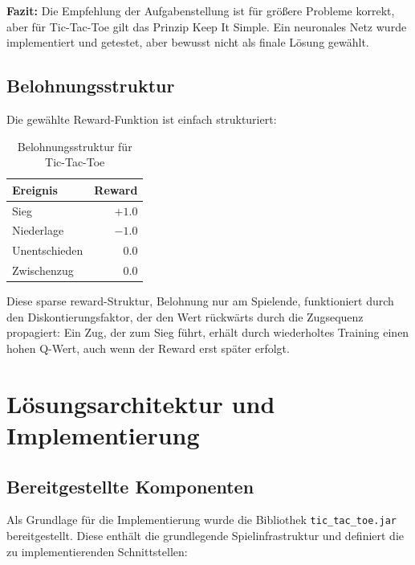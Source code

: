 \textbf{Fazit:} Die Empfehlung der Aufgabenstellung ist für größere Probleme korrekt, aber für Tic-Tac-Toe gilt das Prinzip \glqq Keep It Simple\grqq{}. Ein neuronales Netz wurde implementiert und getestet, aber bewusst nicht als finale Lösung gewählt.

\subsection{Belohnungsstruktur}

Die gewählte Reward-Funktion ist einfach strukturiert:

\begin{table}[H]
\centering
\begin{tabular}{l|r}
\textbf{Ereignis} & \textbf{Reward} \\
\hline
Sieg & $+1.0$ \\
Niederlage & $-1.0$ \\
Unentschieden & $0.0$ \\
Zwischenzug & $0.0$ \\
\end{tabular}
\caption{Belohnungsstruktur für Tic-Tac-Toe}
\end{table}

Diese \glqq sparse reward\grqq{}-Struktur, Belohnung nur am Spielende, funktioniert durch den Diskontierungsfaktor, der den Wert rückwärts durch die Zugsequenz propagiert: Ein Zug, der zum Sieg führt, erhält durch wiederholtes Training einen hohen Q-Wert, auch wenn der Reward erst später erfolgt.


\section{Lösungsarchitektur und Implementierung}

\subsection{Bereitgestellte Komponenten}

Als Grundlage für die Implementierung wurde die Bibliothek \texttt{tic\_tac\_toe.jar} bereitgestellt. Diese enthält die grundlegende Spielinfrastruktur und definiert die zu implementierenden Schnittstellen:

